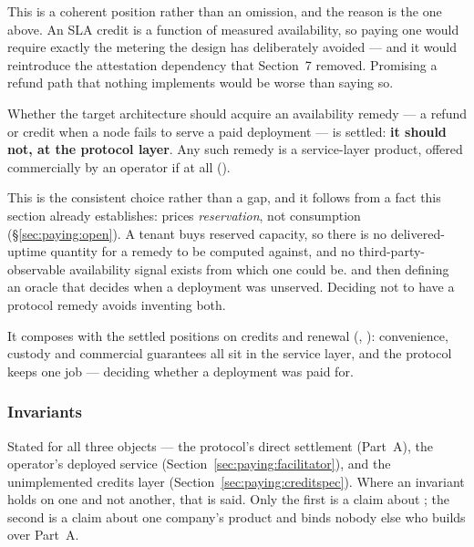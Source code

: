 This is a coherent position rather than an omission, and the reason is the one above. An SLA credit
is a function of measured availability, so paying one would require exactly the metering the design
has deliberately avoided --- and it would reintroduce the attestation dependency that Section~7
removed. Promising a refund path that nothing implements would be worse than saying so.
\begin{remark}
\label{rem:no-sla}
Whether the target architecture should acquire an availability remedy --- a refund or credit when a
node fails to serve a paid deployment --- is settled: \textbf{it should not, at the protocol layer}.
Any such remedy is a service-layer product, offered commercially by an operator if at all
 (\planned).

This is the consistent choice rather than a gap, and it follows from a fact this section already
establishes: \Flux{} prices \emph{reservation}, not consumption (\S\ref{sec:paying:open}). A
tenant buys reserved capacity, so there is no delivered-uptime quantity for a remedy to be computed
against, and no third-party-observable availability signal exists from which one could be.  and then defining an oracle that decides when a deployment was unserved.
Deciding not to have a protocol remedy avoids inventing both.

It composes with the settled positions on credits and renewal (,
): convenience, custody and commercial guarantees all sit in the
service layer, and the protocol keeps one job --- deciding whether a deployment was paid for.
\end{remark}

\subsubsection{Invariants}
\label{sec:paying:invariants}

Stated for all three objects --- the protocol's direct settlement (Part~A), the operator's deployed
service (Section~\ref{sec:paying:facilitator}), and the unimplemented credits layer
(Section~\ref{sec:paying:creditspec}). Where an invariant holds on one and not another, that is said.
Only the first is a claim about \Flux; the second is a claim about one company's product and binds
nobody else who builds over Part~A.

